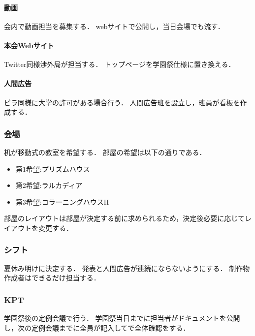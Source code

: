 \paragraph{動画}
会内で動画担当を募集する．
webサイトで公開し，当日会場でも流す．

\paragraph{本会Webサイト}
Twitter同様渉外局が担当する．
トップページを学園祭仕様に置き換える．

\paragraph{人間広告}         
ビラ同様に大学の許可がある場合行う．
人間広告班を設立し，班員が看板を作成する．

\subsubsection*{会場}
机が移動式の教室を希望する．
部屋の希望は以下の通りである．
\begin{itemize}
    \item 第1希望:プリズムハウス
    \item 第2希望:ラルカディア
    \item 第3希望:コラーニングハウスI\hspace{-.1em}I
\end{itemize}
部屋のレイアウトは部屋が決定する前に求められるため，決定後必要に応じてレイアウトを変更する．

\subsubsection*{シフト}
夏休み明けに決定する．
発表と人間広告が連続にならないようにする．
制作物作成者はできるだけ担当する．

\subsubsection*{KPT}
学園祭後の定例会議で行う．
学園祭当日までに担当者がドキュメントを公開し，次の定例会議までに全員が記入してで全体確認をする．

